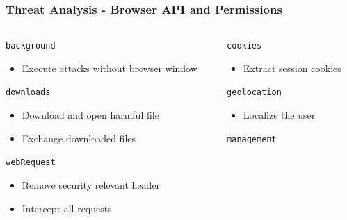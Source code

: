 \documentclass[accentcolor=tud9c,colorbacktitle,xcolor=dvipsnames]{tudbeamer}
\begin{document}
\begin{frame}
    \frametitle{Threat Analysis - Browser API and Permissions}
    \begin{columns}[T]
        \begin{column}[T]{0.5\textwidth}
            \begin{block}{\texttt{background}}
                \begin{itemize}
                    \item Execute attacks without browser window
                \end{itemize}
            \end{block}
            \begin{block}{\texttt{downloads}}
                \begin{itemize}
                    \item Download and open harmful file
                    \item Exchange downloaded files
                \end{itemize}
            \end{block}
            \begin{block}{\texttt{webRequest}}
                \begin{itemize}
                    \item Remove security relevant header
                    \item Intercept all requests
                \end{itemize}
            \end{block} 
        \end{column}
        \begin{column}[T]{0.5\textwidth}
           \begin{block}{\texttt{cookies}}
               \begin{itemize}
                   \item Extract session cookies
                \end{itemize}
            \end{block}
           \begin{block}{\texttt{geolocation}}
               \begin{itemize}
                   \item Localize the user
               \end{itemize}
           \end{block}  
           \begin{block}{\texttt{management}}

\end{block}
\end{column}
\end{columns}
\end{frame}
\end{document}
